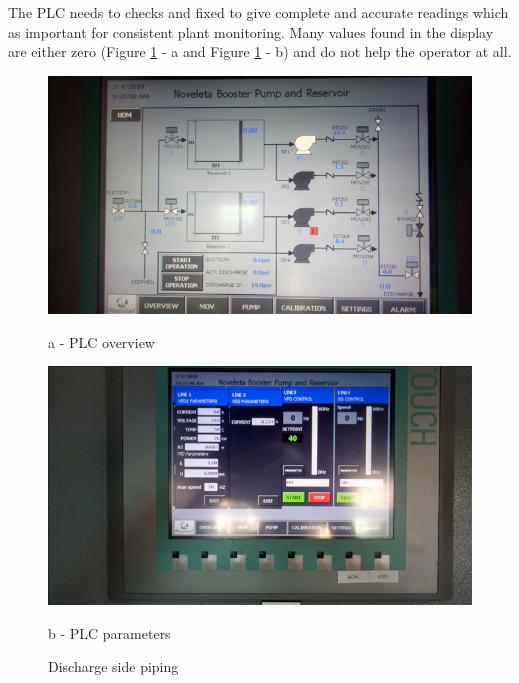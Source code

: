 
The PLC needs to checks and fixed to give complete and accurate readings which as important for consistent plant monitoring. Many values found in the display are either zero (Figure \ref{PLC_displays} - a and Figure \ref{PLC_displays} - b) and do not help the operator at all. 

\begin{figure} [!htb]
	\begin{minipage}[b]{0.5\linewidth}
		\centering
		\includegraphics[width=\textwidth]{figures/fig_ch043_plc1}
		\caption*{a - PLC overview}
		\label{ch043_plc1}
	\end{minipage}
	\hspace{0.05cm}
	\begin{minipage}[b]{0.5\linewidth}
		\centering
		\includegraphics[width=\textwidth]{figures/fig_ch043_plc2}
		\caption*{b - PLC parameters}
		\label{ch043_plc2}
	\end{minipage}
\caption{Discharge side piping}
\label{PLC_displays}
\end{figure}


